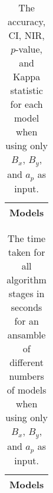 \begin{table}[!ht]
	\centering
	\begin{tabular}{|c|}
		\hline
		Models \\ \hline
	\end{tabular}
	\caption{The accuracy, CI, NIR, $p$-value, and Kappa statistic for each model when using only $B_{x}$, $B_{y}$, and $a_{p}$ as input.}
	\label{tab:time:ansamble:xyap}
\end{table}

\begin{table}[!ht]
	\centering
	\begin{tabular}{|c|}
		\hline
		Models \\ \hline
	\end{tabular}
	\caption{The time taken for all algorithm stages in seconds for an ansamble of different numbers of models when using only $B_{x}$, $B_{y}$, and $a_{p}$ as input.}
	\label{tab:time:ansamble:reverse:xyap}
\end{table}
